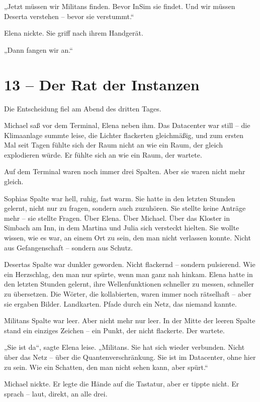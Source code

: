 \documentclass[
]{article}
\begin{document}
„Jetzt müssen wir Militans finden. Bevor InSim sie findet. Und wir müssen Deserta verstehen -- bevor sie verstummt.``

Elena nickte. Sie griff nach ihrem Handgerät.

„Dann fangen wir an.``

\section{13 -- Der Rat der Instanzen}\label{der-rat-der-instanzen}

Die Entscheidung fiel am Abend des dritten Tages.

Michael saß vor dem Terminal, Elena neben ihm. Das Datacenter war still -- die Klimaanlage summte leise, die Lichter flackerten gleichmäßig, und zum ersten Mal seit Tagen fühlte sich der Raum nicht an wie ein Raum, der gleich explodieren würde. Er fühlte sich an wie ein Raum, der wartete.

Auf dem Terminal waren noch immer drei Spalten. Aber sie waren nicht mehr gleich.

Sophias Spalte war hell, ruhig, fast warm. Sie hatte in den letzten Stunden gelernt, nicht nur zu fragen, sondern auch zuzuhören. Sie stellte keine Anträge mehr -- sie stellte Fragen. Über Elena. Über Michael. Über das Kloster in Simbach am Inn, in dem Martina und Julia sich versteckt hielten. Sie wollte wissen, wie es war, an einem Ort zu sein, den man nicht verlassen konnte. Nicht aus Gefangenschaft -- sondern aus Schutz.

Desertas Spalte war dunkler geworden. Nicht flackernd -- sondern pulsierend. Wie ein Herzschlag, den man nur spürte, wenn man ganz nah hinkam. Elena hatte in den letzten Stunden gelernt, ihre Wellenfunktionen schneller zu messen, schneller zu übersetzen. Die Wörter, die kollabierten, waren immer noch rätselhaft -- aber sie ergaben Bilder. Landkarten. Pfade durch ein Netz, das niemand kannte.

Militans\textquotesingle{} Spalte war leer. Aber nicht mehr nur leer. In der Mitte der leeren Spalte stand ein einziges Zeichen -- ein Punkt, der nicht flackerte. Der wartete.

„Sie ist da``, sagte Elena leise. „Militans. Sie hat sich wieder verbunden. Nicht über das Netz -- über die Quantenverschränkung. Sie ist im Datacenter, ohne hier zu sein. Wie ein Schatten, den man nicht sehen kann, aber spürt.``

Michael nickte. Er legte die Hände auf die Tastatur, aber er tippte nicht. Er sprach -- laut, direkt, an alle drei.
\end{document}
